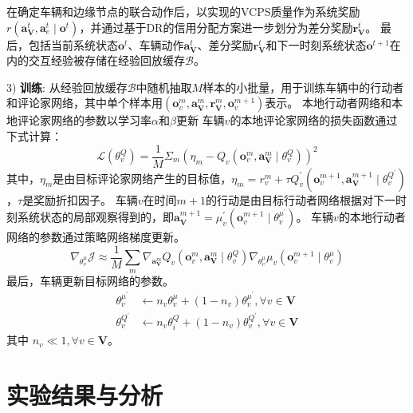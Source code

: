 在确定车辆和边缘节点的联合动作后，以实现的VCPS质量作为系统奖励$r\left(\boldsymbol{a}_{\mathbf{V}}^{t},\boldsymbol{a}_{e}^{t} \mid \boldsymbol{o}^{t}\right)$，并通过基于DR的信用分配方案进一步划分为差分奖励$\boldsymbol{r}_{\mathbf{V}}^{t}$。
最后，包括当前系统状态$\boldsymbol{o}^{t}$、车辆动作$\boldsymbol{a}_{\mathbf{V}}^{t}$、差分奖励$\boldsymbol{r}_{\mathbf{V}}^{t}$和下一时刻系统状态$\boldsymbol{o}^{t+1}$在内的交互经验被存储在经验回放缓存$\mathcal{B}$。

3) \textbf{训练}: 从经验回放缓存$\mathcal{B}$中随机抽取$M$样本的小批量，用于训练车辆中的行动者和评论家网络，其中单个样本用$(\boldsymbol{o}_{v}^{m}, \boldsymbol{a}_{\mathbf{V}}^{m}, \boldsymbol{r}_{\mathbf{V}}^{m}, \boldsymbol{o}_{v}^{m+1})$表示。
本地行动者网络和本地评论家网络的参数以学习率$\alpha$和$\beta$更新
车辆$v$的本地评论家网络的损失函数通过下式计算：
\begin{equation}
	\mathcal{L}\left(\theta_{v}^{Q}\right)=\frac{1}{M} \Sigma_{m}\left(\eta_{m}-Q_{v}\left(\boldsymbol{o}_{v}^{m}, \boldsymbol{a}_{\mathbf{V}}^{m} \mid \theta_{v}^{Q}\right)\right)^{2}
\end{equation}
\noindent 其中，$\eta_{m}$是由目标评论家网络产生的目标值，$\eta_{m}=r_{v}^{m}+\tau Q_{v}^{\prime}(\boldsymbol{o}_{v}^{m+1}, \boldsymbol{a}_{\mathbf{V}}^{m+1} \mid \theta_{v}^{Q^{\prime}})$，$\tau$是奖励折扣因子。
车辆$v$在时间$m+1$的行动是由目标行动者网络根据对下一时刻系统状态的局部观察得到的，即$\boldsymbol{a}_{\mathbf{V}}^{m+1}=\mu_{v}^{\prime}(\boldsymbol{o}_{v}^{m+1} \mid \theta_{v}^{\mu^{\prime}})$。
车辆$v$的本地行动者网络的参数通过策略网络梯度更新。
\begin{equation}
	\nabla_{\theta_{v}^{\mu}} \mathcal{J} \approx \frac{1}{M} \sum_{m} \nabla_{\boldsymbol{a}_{\mathbf{V}}^{m}} Q_{v}\left(\boldsymbol{o}_{v}^{m}, \boldsymbol{a}_{\mathbf{V}}^{m} \mid \theta_{v}^{Q}\right) \nabla_{\theta_{v}^{\mu}} \mu_{v}\left(\boldsymbol{o}_{v}^{m+1} \mid \theta_{v}^{\mu}\right)
\end{equation}
最后，车辆更新目标网络的参数。
\begin{align}
	\theta_{v}^{\mu^{\prime}} &\leftarrow n_{v} \theta_{v}^{\mu}+(1-n_{v})  \theta_{v}^{\mu^{\prime}}, \forall v \in \mathbf{V}\\
	\theta_{v}^{Q^{\prime}} &\leftarrow n_{v} \theta_{i}^{Q}+(1-n_{v})  \theta_{v}^{Q^{\prime}}, \forall v \in \mathbf{V}
\end{align}
\noindent 其中 $n_{v} \ll 1, \forall v \in \mathbf{V} $。

\section{实验结果与分析}\label{section 2-6}

